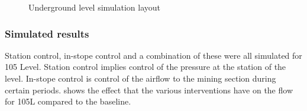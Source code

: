 	\begin{figure}[h!]
		\centering
		\caption{Underground level simulation layout}
		\label{fig: KUS Simulation level layout}
	\end{figure}	
	\clearpage
	\subsubsection{Simulated results}
	Station control, in-stope control and a combination of these were all simulated for 105 Level. Station control implies control of the pressure at the station of the level. In-stope control is control of the airflow to the mining section during certain periods.  shows the effect that the various interventions have on the flow for 105L compared to the baseline.

